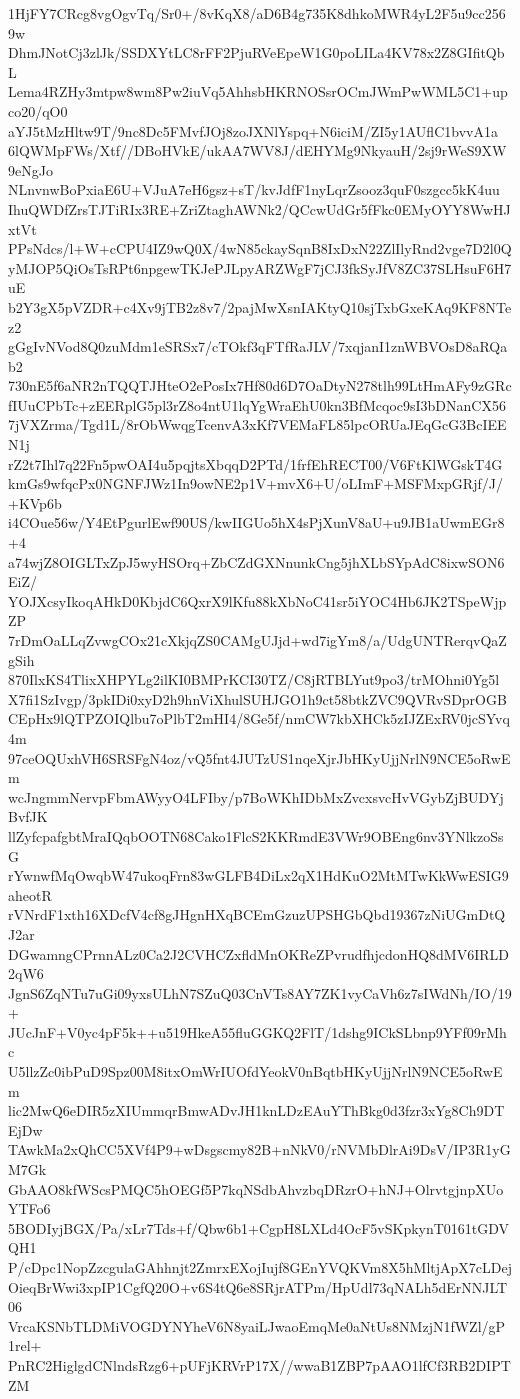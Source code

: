 1HjFY7CRcg8vgOgvTq/Sr0+/8vKqX8/aD6B4g735K8dhkoMWR4yL2F5u9cc2569w
DhmJNotCj3zlJk/SSDXYtLC8rFF2PjuRVeEpeW1G0poLILa4KV78x2Z8GIfitQbL
Lema4RZHy3mtpw8wm8Pw2iuVq5AhhsbHKRNOSsrOCmJWmPwWML5C1+upco20/qO0
aYJ5tMzHltw9T/9nc8Dc5FMvfJOj8zoJXNlYspq+N6iciM/ZI5y1AUflC1bvvA1a
6lQWMpFWs/Xtf//DBoHVkE/ukAA7WV8J/dEHYMg9NkyauH/2sj9rWeS9XW9eNgJo
NLnvnwBoPxiaE6U+VJuA7eH6gsz+sT/kvJdfF1nyLqrZsooz3quF0szgcc5kK4uu
IhuQWDfZrsTJTiRIx3RE+ZriZtaghAWNk2/QCcwUdGr5fFkc0EMyOYY8WwHJxtVt
PPsNdcs/l+W+cCPU4IZ9wQ0X/4wN85ckaySqnB8IxDxN22ZlIlyRnd2vge7D2l0Q
yMJOP5QiOsTsRPt6npgewTKJePJLpyARZWgF7jCJ3fkSyJfV8ZC37SLHsuF6H7uE
b2Y3gX5pVZDR+c4Xv9jTB2z8v7/2pajMwXsnIAKtyQ10sjTxbGxeKAq9KF8NTez2
gGgIvNVod8Q0zuMdm1eSRSx7/cTOkf3qFTfRaJLV/7xqjanI1znWBVOsD8aRQab2
730nE5f6aNR2nTQQTJHteO2ePosIx7Hf80d6D7OaDtyN278tlh99LtHmAFy9zGRc
fIUuCPbTc+zEERplG5pl3rZ8o4ntU1lqYgWraEhU0kn3BfMcqoc9sI3bDNanCX56
7jVXZrma/Tgd1L/8rObWwqgTcenvA3xKf7VEMaFL85lpcORUaJEqGcG3BcIEEN1j
rZ2t7Ihl7q22Fn5pwOAI4u5pqjtsXbqqD2PTd/1frfEhRECT00/V6FtKlWGskT4G
kmGs9wfqcPx0NGNFJWz1In9owNE2p1V+mvX6+U/oLImF+MSFMxpGRjf/J/+KVp6b
i4COue56w/Y4EtPgurlEwf90US/kwIIGUo5hX4sPjXunV8aU+u9JB1aUwmEGr8+4
a74wjZ8OIGLTxZpJ5wyHSOrq+ZbCZdGXNnunkCng5jhXLbSYpAdC8ixwSON6EiZ/
YOJXcsyIkoqAHkD0KbjdC6QxrX9lKfu88kXbNoC41sr5iYOC4Hb6JK2TSpeWjpZP
7rDmOaLLqZvwgCOx21cXkjqZS0CAMgUJjd+wd7igYm8/a/UdgUNTRerqvQaZgSih
870IlxKS4TlixXHPYLg2ilKI0BMPrKCI30TZ/C8jRTBLYut9po3/trMOhni0Yg5l
X7fi1SzIvgp/3pkIDi0xyD2h9hnViXhulSUHJGO1h9ct58btkZVC9QVRvSDprOGB
CEpHx9lQTPZOIQlbu7oPlbT2mHI4/8Ge5f/nmCW7kbXHCk5zIJZExRV0jcSYvq4m
97ceOQUxhVH6SRSFgN4oz/vQ5fnt4JUTzUS1nqeXjrJbHKyUjjNrlN9NCE5oRwEm
wcJngmmNervpFbmAWyyO4LFIby/p7BoWKhIDbMxZvcxsvcHvVGybZjBUDYjBvfJK
llZyfcpafgbtMraIQqbOOTN68Cako1FlcS2KKRmdE3VWr9OBEng6nv3YNlkzoSsG
rYwnwfMqOwqbW47ukoqFrn83wGLFB4DiLx2qX1HdKuO2MtMTwKkWwESIG9aheotR
rVNrdF1xth16XDcfV4cf8gJHgnHXqBCEmGzuzUPSHGbQbd19367zNiUGmDtQJ2ar
DGwamngCPrnnALz0Ca2J2CVHCZxfldMnOKReZPvrudfhjcdonHQ8dMV6IRLD2qW6
JgnS6ZqNTu7uGi09yxsULhN7SZuQ03CnVTs8AY7ZK1vyCaVh6z7sIWdNh/IO/19+
JUcJnF+V0yc4pF5k++u519HkeA55fluGGKQ2FlT/1dshg9ICkSLbnp9YFf09rMhc
U5llzZc0ibPuD9Spz00M8itxOmWrIUOfdYeokV0nBqtbHKyUjjNrlN9NCE5oRwEm
lic2MwQ6eDIR5zXIUmmqrBmwADvJH1knLDzEAuYThBkg0d3fzr3xYg8Ch9DTEjDw
TAwkMa2xQhCC5XVf4P9+wDsgscmy82B+nNkV0/rNVMbDlrAi9DsV/IP3R1yGM7Gk
GbAAO8kfWScsPMQC5hOEGf5P7kqNSdbAhvzbqDRzrO+hNJ+OlrvtgjnpXUoYTFo6
5BODIyjBGX/Pa/xLr7Tds+f/Qbw6b1+CgpH8LXLd4OcF5vSKpkynT0161tGDVQH1
P/cDpc1NopZzcgulaGAhhnjt2ZmrxEXojIujf8GEnYVQKVm8X5hMltjApX7cLDej
OieqBrWwi3xpIP1CgfQ20O+v6S4tQ6e8SRjrATPm/HpUdl73qNALh5dErNNJLT06
VrcaKSNbTLDMiVOGDYNYheV6N8yaiLJwaoEmqMe0aNtUs8NMzjN1fWZl/gP1rel+
PnRC2HiglgdCNlndsRzg6+pUFjKRVrP17X//wwaB1ZBP7pAAO1lfCf3RB2DIPTZM
